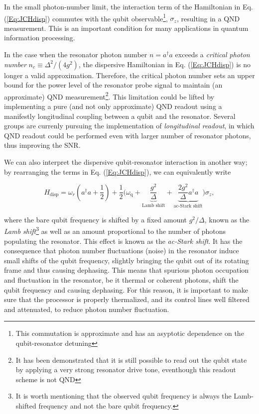 \documentclass[aip,apr,twocolumn,showpacs,superscriptaddress,groupedaddress,nofootinbib,reprint]{revtex4-1}  %
\newcommand{\freq}{\omega_\text{q}}
\begin{document}
In the small photon-number limit, the interaction term of the Hamiltonian in Eq. (\ref{Eq:JCHdisp}) commutes with the qubit observable\footnote{This commutation is approximate and has an asyptotic dependence on the qubit-resonator detuning}, $\sigma_z$, resulting in a QND measurement\cite{Braginsky1996}. This is an important condition for many applications in quantum information processing.

In the case when the resonator photon number $n = a^{\dagger}a$ exceeds a \textit{critical photon number} $n_c \equiv \Delta^2/(4g^2)$, the dispersive Hamiltonian in Eq. (\ref{Eq:JCHdisp}) is no longer a valid approximation\cite{Blais2004,Gambetta2006,Sank2016}. Therefore, the critical photon number sets an upper bound for the power level of the resonator probe signal to maintain (an approximate) QND measurement\footnote{It has been demonstrated that it is still possible to read out the qubit state by applying a very strong resonator drive tone, eventhough this readout scheme is not QND\cite{Reed2010b}}. This limitation could be lifted by implementing a pure (and not only approximate) QND readout using a manifestly longitudinal coupling between a qubit and the resonator. Several groups are currenly pursuing the implementation of \textit{longitudinal readout}, in which QND readout could be performed even with larger number of resonator photons, thus improving the SNR\cite{Kerman2013,Didier2015,Richer2016}.

We can also interpret the dispersive qubit-resonator interaction in another way; by rearranging the terms in Eq. (\ref{Eq:JCHdisp}), we can equivalently write

\begin{equation}
H_{\text{disp}} = \omega_r \left( a^{\dagger}a + \frac{1}{2}\right) + \frac{1}{2}\bigg( \freq + \underbrace{\frac{g^2}{\Delta}}_{\text{Lamb shift}} + \underbrace{\frac{2g^2}{\Delta}a^{\dagger}a}_{\text{ac-Stark shift}}\bigg)\sigma_z,
\label{Eq:JCHdisp2}
\end{equation}

\noindent where the bare qubit frequency is shifted by a fixed amount $g^2/\Delta$, known as the \textit{Lamb shift}\footnote{It is worth mentioning that the observed qubit frequency is always the Lamb-shifted frequency and not the bare qubit frequency.} as well as an amount proportional to the number of photons populating the resonator\cite{Blais2004,Koch2007}. This effect is known as the \textit{ac-Stark shift}. It has the consequence that photon number fluctuations (noise) in the resonator induce small shifts of the qubit frequency, slightly bringing the qubit out of its rotating frame and thus causing dephasing\cite{Schuster2005}. This means that spurious photon occupation and fluctuation in the resonator, be it thermal or coherent photons, shift the qubit frequency and causing dephasing\cite{Gambetta2006,Zhang2017}. For this reason, it is important to make sure that the processor is properly thermalized\cite{Yan2018}, and its control lines well filtered\cite{ReedPhD2013} and attenuated\cite{Yeh2017}, to reduce photon number fluctuation.
\end{document}
